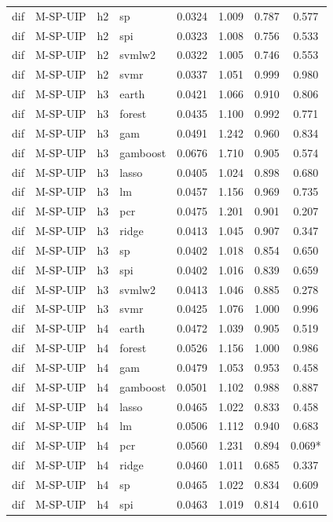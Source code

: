 \begin{ThreePartTable}
\begin{longtable}[t]{llclcccc}
dif & M-SP-UIP & h2 & sp & 0.0324 & 1.009 & 0.787 & 0.577\\
dif & M-SP-UIP & h2 & spi & 0.0323 & 1.008 & 0.756 & 0.533\\
dif & M-SP-UIP & h2 & svmlw2 & 0.0322 & 1.005 & 0.746 & 0.553\\
dif & M-SP-UIP & h2 & svmr & 0.0337 & 1.051 & 0.999 & 0.980\\
\addlinespace
dif & M-SP-UIP & h3 & earth & 0.0421 & 1.066 & 0.910 & 0.806\\
dif & M-SP-UIP & h3 & forest & 0.0435 & 1.100 & 0.992 & 0.771\\
dif & M-SP-UIP & h3 & gam & 0.0491 & 1.242 & 0.960 & 0.834\\
dif & M-SP-UIP & h3 & gamboost & 0.0676 & 1.710 & 0.905 & 0.574\\
dif & M-SP-UIP & h3 & lasso & 0.0405 & 1.024 & 0.898 & 0.680\\
dif & M-SP-UIP & h3 & lm & 0.0457 & 1.156 & 0.969 & 0.735\\
dif & M-SP-UIP & h3 & pcr & 0.0475 & 1.201 & 0.901 & 0.207\\
dif & M-SP-UIP & h3 & ridge & 0.0413 & 1.045 & 0.907 & 0.347\\
dif & M-SP-UIP & h3 & sp & 0.0402 & 1.018 & 0.854 & 0.650\\
dif & M-SP-UIP & h3 & spi & 0.0402 & 1.016 & 0.839 & 0.659\\
dif & M-SP-UIP & h3 & svmlw2 & 0.0413 & 1.046 & 0.885 & 0.278\\
dif & M-SP-UIP & h3 & svmr & 0.0425 & 1.076 & 1.000 & 0.996\\
\addlinespace
dif & M-SP-UIP & h4 & earth & 0.0472 & 1.039 & 0.905 & 0.519\\
dif & M-SP-UIP & h4 & forest & 0.0526 & 1.156 & 1.000 & 0.986\\
dif & M-SP-UIP & h4 & gam & 0.0479 & 1.053 & 0.953 & 0.458\\
dif & M-SP-UIP & h4 & gamboost & 0.0501 & 1.102 & 0.988 & 0.887\\
dif & M-SP-UIP & h4 & lasso & 0.0465 & 1.022 & 0.833 & 0.458\\
dif & M-SP-UIP & h4 & lm & 0.0506 & 1.112 & 0.940 & 0.683\\
dif & M-SP-UIP & h4 & pcr & 0.0560 & 1.231 & 0.894 & 0.069*\\
dif & M-SP-UIP & h4 & ridge & 0.0460 & 1.011 & 0.685 & 0.337\\
dif & M-SP-UIP & h4 & sp & 0.0465 & 1.022 & 0.834 & 0.609\\
dif & M-SP-UIP & h4 & spi & 0.0463 & 1.019 & 0.814 & 0.610\\

\end{longtable}
\end{ThreePartTable}
